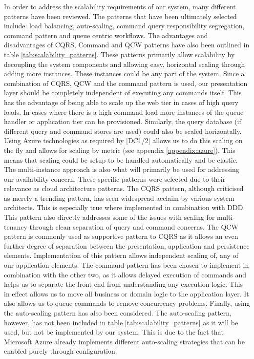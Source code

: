 In order to address the scalability requirements of our system, many different patterns have been reviewed. The patterns that have been ultimately selected include: load balancing, auto-scaling, command query responsibility segregation, command pattern and queue centric workflows. The advantages and disadvantages of CQRS, Command and QCW  patterns have also been outlined in table \ref{tab:scalability_patterns}. These patterns primarily allow scalability by decoupling the system components and allowing easy, horizontal scaling through adding more instances. These instances could be any part of the system. Since a combination of CQRS,  QCW and the command pattern  is used, our presentation layer should be completely independent of executing any commands itself. This has the advantage of being able to scale up the web tier in cases of high query loads. In cases where there is a high command load more instances of the queue handler or application tier can be provisioned. Similarly, the query database (if different query and command stores are used) could also be scaled horizontally. Using Azure technologies as required by [DC1/2] allows us to do this scaling on the fly and allows for scaling by metric (see appendix \ref{appendix:azure}). This means that scaling could be setup to be handled automatically and be elastic. The multi-instance approach is also what will primarily be used for addressing our availability concern. These specific patterns were selected due to their relevance as cloud architecture patterns. The CQRS pattern, although criticised as merely a trending pattern, has seen widespread acclaim by various system architects. This is especially true where implemented in combination with DDD. This pattern also directly addresses some of the issues with scaling for multi-tenancy through clean separation of query and command concerns. The QCW pattern is commonly used as supportive pattern to CQRS as it allows an even further degree of separation between the presentation, application and persistence elements. Implementation of this pattern allows independent scaling of, any of our application elements. The command pattern has been chosen to implement in combination with the other two, as it allows delayed execution of commands and helps us to separate the front end from understanding any execution logic. This in effect allows us to move all business or domain logic to the application layer. It also allows us to queue commands to remove concurrency problems. Finally, using the auto-scaling pattern has also been considered. The auto-scaling pattern, however, has not been included in table \ref{tab:scalability_patterns} as it will be used, but not be implemented by our system. This is due to the fact that Microsoft Azure already implements different auto-scaling strategies that can be enabled purely through configuration.  


